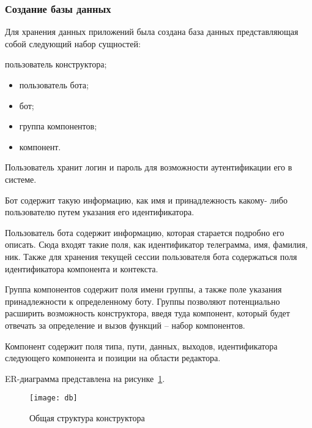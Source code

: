 
\subsubsection{Создание базы данных}

Для хранения данных приложений была создана база данных
представляющая собой следующий набор сущностей:

пользователь конструктора;
\begin{itemize}
	\item пользователь бота;
	\item бот;
	\item группа компонентов;
	\item компонент.
\end{itemize}

Пользователь хранит логин и пароль для возможности аутентификации
его в системе.

Бот содержит такую информацию, как имя и принадлежность какому-
либо пользователю путем указания его идентификатора.

Пользователь бота содержит информацию, которая старается подробно
его описать. Сюда входят такие поля, как идентификатор телеграмма, имя,
фамилия, ник. Также для хранения текущей сессии пользователя бота
содержаться поля идентификатора компонента и контекста.

Группа компонентов содержит поля имени группы, а также поле
указания принадлежности к определенному боту. Группы позволяют
потенциально расширить возможность конструктора, введя туда компонент,
который будет отвечать за определение и вызов функций – набор
компонентов.

Компонент содержит поля типа, пути, данных, выходов,
идентификатора следующего компонента и позиции на области редактора.

ER-диаграмма представлена на рисунке~\ref{f:erd}.

\begin{figure}[ht]
	\centering
	\texttt{[image: db]}
	\caption{Общая структура конструктора}
	\label{f:erd}
\end{figure}


